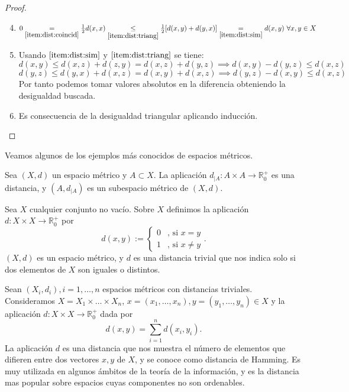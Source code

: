 \documentclass{book}
\begin{document}
\begin{proof}
	$ $ \newline
	\begin{enumerate}
		\setcounter{enumi}{3}
		\item $ 0 \underset{\ref{item:dist:coincid}}{=} \frac{1}{2}d(x,x) \underset{\ref{item:dist:triang}}{\le}\frac{1}{2}[d(x,y)+d(y,x)]\underset{\ref{item:dist:sim}}{=}d(x,y) \ \forall x,y \in X$
		
		\item Usando $\ref{item:dist:sim}$ y $\ref{item:dist:triang}$ se tiene:
		\[d(x,y) \le d(x,z) + d(z,y) = d(x,z)+d(y,z) \implies d(x,y)-d(y,z)\le d(x,z)\]
		\[d(y,z) \le d(y,x) + d(x,z) = d(x,y)+d(x,z) \implies d(y,z)-d(x,y)\le d(x,z) \]
		Por tanto podemos tomar valores absolutos en la diferencia obteniendo la desigualdad buscada.
		
		\item Es consecuencia de la desigualdad triangular aplicando inducción.
	\end{enumerate}
\end{proof}

Veamos algunos de los ejemplos más conocidos de espacios métricos.

\begin{example}
Sea $(X,d)$ un espacio métrico y $A\subset X$. La aplicación $d_{|A}:A\times A \to \mathbb{R}^+_0$ es una distancia, y $(A,d_{|A})$ es un subespacio métrico de $(X,d)$.
\end{example}

\begin{example}
	Sea $X$ cualquier conjunto no vacío. Sobre $X$ definimos la aplicación $d:X\times X \to \mathbb{R}^+_0$ por
	\[d(x,y):= \begin{cases}
	0 & \text{, si } x = y \\
	1 & \text{, si } x \ne y
	\end{cases}.\]
	$(X,d)$ es un espacio métrico, y $d$ es una distancia trivial que nos indica solo si dos elementos de $X$ son iguales o distintos.
\end{example}

\begin{example}
	Sean $(X_i,d_i), i=1,\dots, n$ espacios métricos con distancias triviales. Consideramos $X = X_1 \times \dots \times X_n$, $x = (x_1,\dots,x_n), y = (y_1,\dots,y_n) \in X$ y la aplicación $d:X\times X \to \mathbb{R}^+_0$ dada por
	\[d(x,y) = \sum_{i=1}^n d(x_i,y_i).\]
	La aplicación $d$ es una distancia que nos muestra el número de elementos que difieren entre dos vectores $x,y$ de $X$, y se conoce como distancia de Hamming. Es muy utilizada en algunos ámbitos de la teoría de la información, y es la distancia mas popular sobre espacios cuyas componentes no son ordenables.
\end{example}
\end{document}
